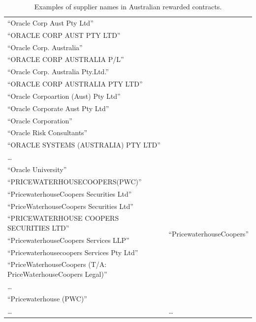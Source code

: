 \documentclass{llncs}
\begin{document}
\begin{table}[!htb]
\begin{center}
\begin{tabular}{|p{7cm}|p{7cm}|}
  ``Oracle Corp Aust Pty Ltd'' & \\
  ``ORACLE CORP AUST PTY LTD'' & \\
  ``Oracle Corp. Australia'' & \\
  ``ORACLE CORP AUSTRALIA P/L'' & \\
  ``Oracle Corp. Australia Pty.Ltd.'' & \\
  ``ORACLE CORP AUSTRALIA PTY LTD'' & \\
  ``Oracle Corpoartion (Aust) Pty Ltd'' & \\
  ``Oracle Corporate Aust Pty Ltd'' & \\
  ``Oracle Corporation'' & \\
  ``Oracle Risk Consultants'' & \\
  ``ORACLE SYSTEMS (AUSTRALIA) PTY LTD'' & \\
  \ldots  & \\
  ``Oracle University''  & \\ \hline
  ``PRICEWATERHOUSECOOPERS(PWC)''  & \multirow{8}{*}{``PricewaterhouseCoopers''} \\
  ``PricewaterhouseCoopers Securities Ltd''& \multirow{8}{*}{\scriptsize\url{http://dbpedia.org/resource/PricewaterhouseCoopers}} \\
  ``PriceWaterhouseCoopers Securities Ltd'' & \\
  ``PRICEWATERHOUSE COOPERS SECURITIES LTD'' & \\
  ``PricewaterhouseCoopers Services LLP'' & \\
  ``Pricewaterhousecoopers Services Pty Ltd'' & \\
  ``PriceWaterhouseCoopers (T/A: PriceWaterhouseCoopers Legal)'' & \\
  \ldots  & \\
  ``Pricewaterhouse (PWC)'' & \\ \hline
  \ldots & \ldots \\
  \hline
  \end{tabular}
  \caption{Examples of supplier names in Australian rewarded contracts.}
  \label{tabla:aus-suppliers}
  \end{center}
\end{table} 
\end{document}
